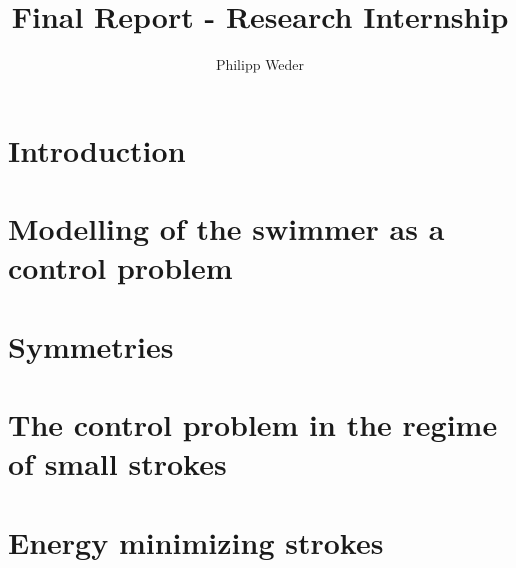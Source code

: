 \documentclass[10pt,a4paper]{article}
\author{Philipp Weder}
\title{\textbf{Final Report - Research Internship}}
\date{}
\theoremstyle{plain}
\theoremstyle{plain}
\theoremstyle{plain}
\theoremstyle{remark}
\theoremstyle{definition}
\theoremstyle{definition}
\theoremstyle{plain}
\theoremstyle{plain}
\begin{document}
\linespread{1.05}
\maketitle

\section{Introduction}


\section{Modelling of the swimmer as a control problem}


\section{Symmetries}


\section{The control problem in the regime of small strokes}


\section{Energy minimizing strokes}



\printbibliography
\end{document}
